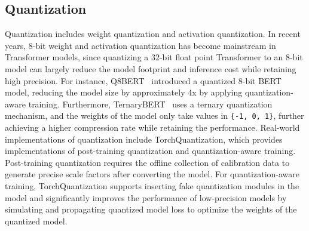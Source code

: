 \subsection{Quantization}\label{subsec:rw:quantization}
Quantization includes weight quantization and activation quantization.
In recent years, 8-bit weight and activation quantization has become mainstream in Transformer models,
since quantizing a 32-bit float point Transformer to an 8-bit model can largely reduce the model footprint
and inference cost while retaining high precision.
For instance, Q8BERT~\cite{zafrir2019q8bert} introduced a quantized 8-bit BERT model,
reducing the model size by approximately 4x by applying quantization-aware training.
Furthermore, TernaryBERT~\cite{zhang2020ternarybert} uses a ternary quantization mechanism,
and the weights of the model only take values in \texttt{\{-1, 0, 1\}},
further achieving a higher compression rate while retaining the performance.
Real-world implementations of quantization include TorchQuantization,
which provides implementations of post-training quantization and quantization-aware training.
Post-training quantization requires the offline collection of calibration data to generate precise scale factors
after converting the model.
For quantization-aware training, TorchQuantization supports inserting fake quantization modules
in the model and significantly improves the performance of low-precision models by simulating
and propagating quantized model loss to optimize the weights of the quantized model.
